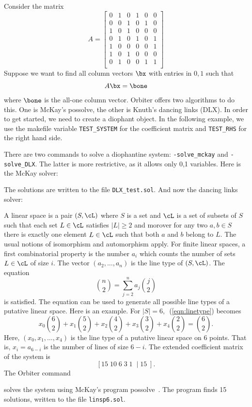 Consider the matrix 
$$
A= 
\left[
\begin{array}{cccccc}
0&1&0&1&0&0\\
0&0&1&0&1&0\\
1&0&1&0&0&0\\
0&1&0&1&0&1\\
1&0&0&0&0&1\\
1&0&1&0&0&0\\
0&1&0&0&1&1\\
\end{array}
\right]
$$
Suppose we want to find all column vectors $\bx$ with entries in $0,1$ such that 
$$
A \bx = \bone
$$
where $\bone$ is the all-one column vector.
Orbiter offers two algorithms to do this. 
One is McKay's possolve, the other is Knuth's dancing links (DLX).
In order to get started, we need to create a diophant object.
In the following example, we use the makefile variable \verb'TEST_SYSTEM' for the 
coefficient matrix and \verb'TEST_RHS' for the right hand side.
{\tt

}
{\tt

}
{\tt

}

There are two commands to solve a diophantine system: \verb'-solve_mckay' and \verb'-solve_DLX'. The latter is more restrictive, 
as it allows only 0,1 variables.
Here is the McKay solver:
{\tt

}
The solutions are written to the file \verb'DLX_test.sol'. 
And now the dancing links solver:
{\tt

}


\bigskip


A linear space is a pair $(S,\cL)$ where $S$ is a set and $\cL$ is a set of subsets of $S$ such that 
each set $L \in \cL$ satisfies $|L| \ge 2$ and 
morover for any two $a,b \in S$ there is exactly one element $L \in \cL$
such that both $a$ and $b$ belong to $L.$ 
The usual notions of isomorphism and automorphism apply.
For finite linear spaces, a first combinatorial property is the number $a_i$ 
which counts the number of sets $L \in \cL$ of size $i.$ 
The vector $(a_2,\ldots,a_n)$ is the line type of $(S,\cL)$.
The equation 
\begin{equation}\label{eqn:linetype}
{n \choose 2} = \sum_{j=2}^n a_j {j \choose 2}
\end{equation}
is satisfied. 
The equation 
can be used to generate all possible line types of a putative linear space.
Here is an example. For $|S| = 6,$~(\ref{eqn:linetype}) becomes
$$
x_0 {6 \choose 2} + x_1 {5 \choose 2} + x_2 {4 \choose 2} + x_3 {3 \choose 2} + x_4 {2 \choose 2} = {6 \choose 2}.
$$
Here, $(x_0,x_1,\ldots,x_4)$ is the line type of a putative linear space on $6$ points. 
That is, $x_i = a_{6-i}$ is the number of lines of size $6-i.$
The extended coefficient matrix of the system is 
$$
\left[ 
15 \; 
10 \; 
6 \; 
3 \; 
1 \; 
\mid 
15 
\;
\right].
$$
The Orbiter command
{\tt

}
solves the system using  McKay's program possolve~\cite{Possolve}. 
The program finds 15 solutions, written to the file \verb'linsp6.sol'.


